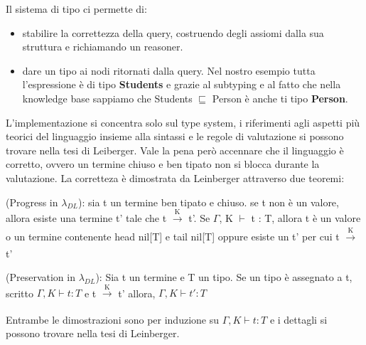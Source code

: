     Il sistema di tipo ci permette di:
    \begin{itemize}
        \item stabilire la correttezza della query, costruendo degli assiomi dalla sua struttura e richiamando un reasoner.
        \item dare un tipo ai nodi ritornati dalla query. Nel nostro esempio tutta l'espressione è di tipo \textbf{Students} e grazie al subtyping e al fatto
            che nella knowledge base sappiamo che Students $\sqsubseteq$ Person è anche ti tipo \textbf{Person}.
    \end{itemize}
    L'implementazione si concentra solo sul type system, i riferimenti agli aspetti più teorici del linguaggio insieme alla sintassi e le regole di valutazione
    si possono trovare nella tesi di Leiberger.
    Vale la pena per\`o accennare che il linguaggio è corretto, ovvero un termine chiuso e ben tipato non si blocca durante la valutazione.
    La corretteza è dimostrata da Leinberger attraverso due teoremi:
    \begin{theorem}
        (Progress in $\lambda_{DL}$): sia t un termine ben tipato e chiuso. se t non è un valore, allora esiste una termine t' tale che
        t $\xrightarrow[]{\text{K}}$ t'. Se $\Gamma$, K $\vdash$ t : T, allora t è un valore o un termine contenente head nil[T] e tail nil[T] oppure esiste
        un t' per cui t $\xrightarrow[]{\text{K}}$ t'
    \end{theorem}
    \begin{theorem}
        (Preservation in $\lambda_{DL}$): Sia t un termine e T un tipo. Se un tipo è assegnato a t, scritto $\Gamma,K \vdash t : T$ e t $\xrightarrow[]{\text{K}}$ t'
        allora, $\Gamma,K \vdash t' : T$
    \end{theorem}
    Entrambe le dimostrazioni sono per induzione su $\Gamma,K \vdash t : T$ e i dettagli si possono trovare nella tesi di Leinberger.
\newpage
